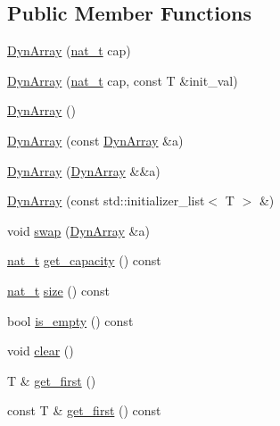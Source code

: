 \subsection*{Public Member Functions}
\begin{DoxyCompactItemize}
\item 
\hyperlink{class_designar_1_1_dyn_array_a9a00e1336657f98b96e7c38fc7da332c}{Dyn\+Array} (\hyperlink{namespace_designar_aa72662848b9f4815e7bf31a7cf3e33d1}{nat\+\_\+t} cap)
\item 
\hyperlink{class_designar_1_1_dyn_array_afc29c646a101761f0e7a6fb8080b38fd}{Dyn\+Array} (\hyperlink{namespace_designar_aa72662848b9f4815e7bf31a7cf3e33d1}{nat\+\_\+t} cap, const T \&init\+\_\+val)
\item 
\hyperlink{class_designar_1_1_dyn_array_ad51d585e1ee5f4fb0649e3e96392817b}{Dyn\+Array} ()
\item 
\hyperlink{class_designar_1_1_dyn_array_ad9a7d66713068ccea6a5d7fb430f59e3}{Dyn\+Array} (const \hyperlink{class_designar_1_1_dyn_array}{Dyn\+Array} \&a)
\item 
\hyperlink{class_designar_1_1_dyn_array_a59a55c42901c2687505ecfbc3d577a44}{Dyn\+Array} (\hyperlink{class_designar_1_1_dyn_array}{Dyn\+Array} \&\&a)
\item 
\hyperlink{class_designar_1_1_dyn_array_a8bea25568b1f9292c2cb221b774ece13}{Dyn\+Array} (const std\+::initializer\+\_\+list$<$ T $>$ \&)
\item 
void \hyperlink{class_designar_1_1_dyn_array_a70d4d7e34ed05280f849adb6aa20180d}{swap} (\hyperlink{class_designar_1_1_dyn_array}{Dyn\+Array} \&a)
\item 
\hyperlink{namespace_designar_aa72662848b9f4815e7bf31a7cf3e33d1}{nat\+\_\+t} \hyperlink{class_designar_1_1_dyn_array_afa027281e5790d05269d5972ec2ea177}{get\+\_\+capacity} () const
\item 
\hyperlink{namespace_designar_aa72662848b9f4815e7bf31a7cf3e33d1}{nat\+\_\+t} \hyperlink{class_designar_1_1_dyn_array_a7261fdb2ace9cdefbacb49d06c2f919d}{size} () const
\item 
bool \hyperlink{class_designar_1_1_dyn_array_ae4692786599e9be77a9ca963b2fe7bf8}{is\+\_\+empty} () const
\item 
void \hyperlink{class_designar_1_1_dyn_array_abea6b41f8373dc60753255f3c390507f}{clear} ()
\item 
T \& \hyperlink{class_designar_1_1_dyn_array_a85d8c50ef17c71d675961ba0268c2278}{get\+\_\+first} ()
\item 
const T \& \hyperlink{class_designar_1_1_dyn_array_a0b8735deaef51cfc0ff7c84994c3d838}{get\+\_\+first} () const

\end{DoxyCompactItemize}
